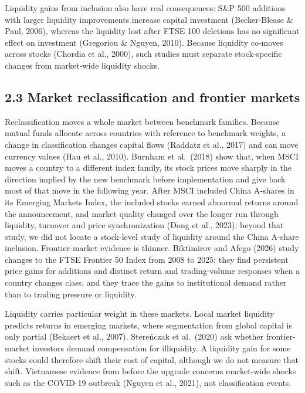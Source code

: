Liquidity gains from inclusion also have real consequences: S\&P 500
additions with larger liquidity improvements increase capital investment
(Becker-Blease \& Paul, 2006), whereas the liquidity lost after FTSE 100
deletions has no significant effect on investment (Gregoriou \& Nguyen,
2010). Because liquidity co-moves across stocks (Chordia et al., 2000),
such studies must separate stock-specific changes from market-wide
liquidity shocks.

\hypertarget{market-reclassification-and-frontier-markets}{%
\subsection{2.3 Market reclassification and frontier
markets}\label{market-reclassification-and-frontier-markets}}

Reclassification moves a whole market between benchmark families.
Because mutual funds allocate across countries with reference to
benchmark weights, a change in classification changes capital flows
(Raddatz et al., 2017) and can move currency values (Hau et al., 2010).
Burnham et al.~(2018) show that, when MSCI moves a country to a
different index family, its stock prices move sharply in the direction
implied by the new benchmark before implementation and give back most of
that move in the following year. After MSCI included China A-shares in
its Emerging Markets Index, the included stocks earned abnormal returns
around the announcement, and market quality changed over the longer run
through liquidity, turnover and price synchronization (Dong et al.,
2023); beyond that study, we did not locate a stock-level study of
liquidity around the China A-share inclusion. Frontier-market evidence
is thinner. Biktimirov and Afego (2026) study changes to the FTSE
Frontier 50 Index from 2008 to 2025; they find persistent price gains
for additions and distinct return and trading-volume responses when a
country changes class, and they trace the gains to institutional demand
rather than to trading pressure or liquidity.

Liquidity carries particular weight in these markets. Local market
liquidity predicts returns in emerging markets, where segmentation from
global capital is only partial (Bekaert et al., 2007). Stereńczak et
al.~(2020) ask whether frontier-market investors demand compensation for
illiquidity. A liquidity gain for some stocks could therefore shift
their cost of capital, although we do not measure that shift. Vietnamese
evidence from before the upgrade concerns market-wide shocks such as the
COVID-19 outbreak (Nguyen et al., 2021), not classification events.

